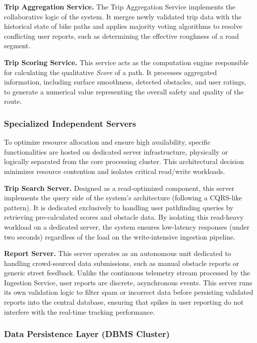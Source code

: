 \textbf{Trip Aggregation Service.}
The Trip Aggregation Service implements the collaborative logic of the system. It merges newly validated trip data with the historical state of bike paths and applies majority voting algorithms to resolve conflicting user reports, such as determining the effective roughness of a road segment.

\textbf{Trip Scoring Service.}
This service acts as the computation engine responsible for calculating the qualitative \textit{Score} of a path. It processes aggregated information, including surface smoothness, detected obstacles, and user ratings, to generate a numerical value representing the overall safety and quality of the route.
\subsubsection{Specialized Independent Servers}

To optimize resource allocation and ensure high availability, specific functionalities are hosted on dedicated server infrastructure, physically or logically separated from the core processing cluster. This architectural decision minimizes resource contention and isolates critical read/write workloads.

\textbf{Trip Search Server.}
Designed as a read-optimized component, this server implements the query side of the system's architecture (following a CQRS-like pattern). It is dedicated exclusively to handling user pathfinding queries by retrieving pre-calculated scores and obstacle data. By isolating this read-heavy workload on a dedicated server, the system ensures low-latency responses (under two seconds) regardless of the load on the write-intensive ingestion pipeline.

\textbf{Report Server.}
This server operates as an autonomous unit dedicated to handling crowd-sourced data submissions, such as manual obstacle reports or generic street feedback. Unlike the continuous telemetry stream processed by the Ingestion Service, user reports are discrete, asynchronous events. This server runs its own validation logic to filter spam or incorrect data before persisting validated reports into the central database, ensuring that spikes in user reporting do not interfere with the real-time tracking performance.


\subsubsection{Data Persistence Layer (DBMS Cluster)}


